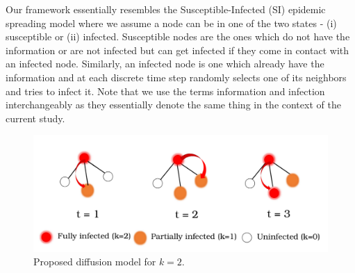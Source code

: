 Our framework essentially resembles the Susceptible-Infected (SI) epidemic spreading model where we assume
a node can be in one of the two states - (i) susceptible or (ii)
infected. Susceptible nodes are the ones which do not have the
information or are not infected but can get infected if they come in contact
with an infected node. Similarly, an infected node is one which
already have the information and at each discrete time step randomly
selects one of its neighbors and tries to infect it. Note that we use the terms 
information and infection interchangeably as they essentially denote the
same thing in the context of the current study. 
\fi
 \begin{figure}[htpb]
  \centering
  \includegraphics[scale=0.37]{./texfiles/Chapter_3/epl/figs1/dynamics.pdf}
 
 \caption{\label{fig_dynamics}Proposed diffusion model for $k=2$.}
\end{figure}
 
